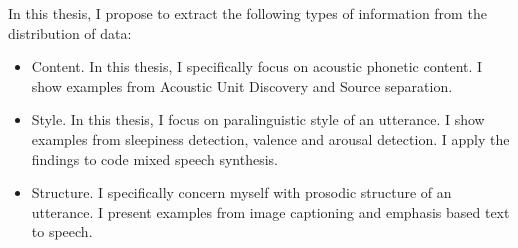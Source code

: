 In this thesis, I propose to extract the following types of information from the distribution of data:

\begin{itemize}
    \item Content. In this thesis, I specifically focus on acoustic phonetic content. I show examples from Acoustic Unit Discovery and Source separation.
    \item Style. In this thesis, I focus on paralinguistic style of an utterance. I show examples from sleepiness detection, valence and arousal detection. I apply the findings to code mixed speech synthesis.
    \item Structure. I specifically concern myself with prosodic structure of an utterance. I present examples from image captioning and emphasis based text to speech. 
\end{itemize}
